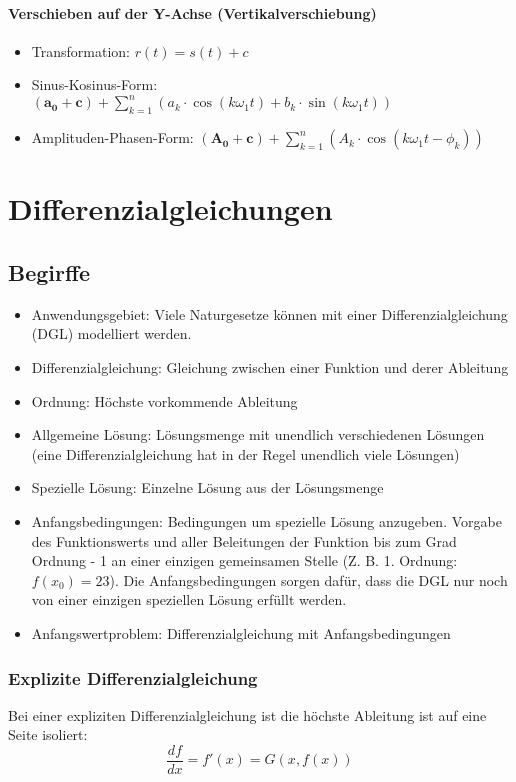 \paragraph{Verschieben auf der Y-Achse (Vertikalverschiebung)}
\begin{itemize}
  \item Transformation: $r(t) = s(t) + c$
  \item Sinus-Kosinus-Form: $\boldsymbol{(a_0 + c)} + \sum_{k=1}^{n} ( a_k \cdot
    \cos(k \omega_1 t) + b_k \cdot \sin(k \omega_1 t))$
  \item Amplituden-Phasen-Form: $\boldsymbol{(A_0 + c)} + \sum_{k=1}^{n}
    (A_k \cdot \cos(k \omega_1 t  - \phi_k))$
\end{itemize}


\section{Differenzialgleichungen}
\subsection{Begirffe}
\begin{itemize}
  \item Anwendungsgebiet: Viele Naturgesetze können mit einer
    Differenzialgleichung (DGL) modelliert werden.
  \item Differenzialgleichung: Gleichung zwischen einer Funktion und
    derer Ableitung
  \item Ordnung: Höchste vorkommende Ableitung
  \item Allgemeine Lösung: Lösungsmenge mit unendlich verschiedenen
    Lösungen (eine Differenzialgleichung hat in der Regel unendlich viele Lösungen)
  \item Spezielle Lösung: Einzelne Lösung aus der Lösungsmenge
  \item Anfangsbedingungen: Bedingungen um spezielle Lösung anzugeben.
    Vorgabe des Funktionswerts und aller Beleitungen der Funktion bis zum
    Grad Ordnung - 1 an einer einzigen gemeinsamen Stelle (Z. B. 1.
    Ordnung: $f(x_0) = 23$). Die Anfangsbedingungen sorgen dafür, dass
    die DGL nur noch von einer einzigen speziellen Lösung erfüllt
    werden.
  \item Anfangswertproblem: Differenzialgleichung mit Anfangsbedingungen
\end{itemize}

\subsubsection{Explizite Differenzialgleichung}
Bei einer expliziten Differenzialgleichung ist die höchste Ableitung ist
auf eine Seite isoliert:
\[ \frac{df}{dx} = f'(x) = G(x, f(x)) \]

